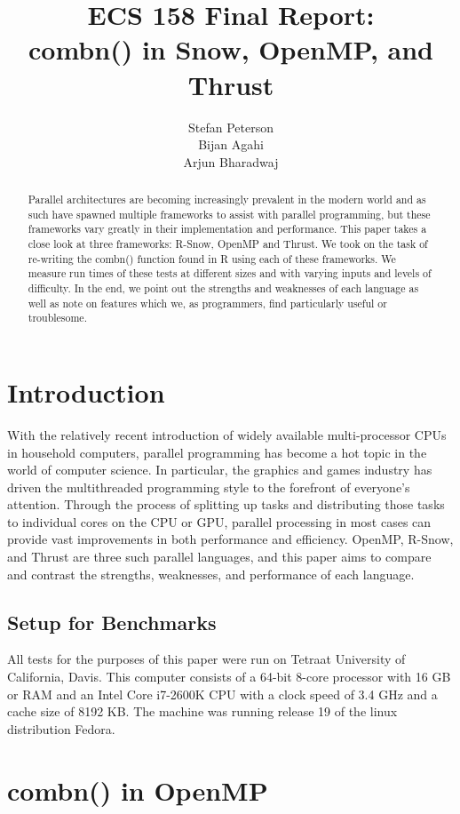 \documentclass[titlepage, 11pt]{article}
\title{\Huge ECS 158 Final Report: \\\LARGE combn() in Snow, OpenMP, and Thrust}
\date{}
\author{\huge Stefan Peterson\\\huge Bijan Agahi \\\huge Arjun Bharadwaj}
\begin{document}
\maketitle
\begin{abstract}
Parallel architectures are becoming increasingly prevalent in the modern world and as such have spawned multiple frameworks to assist with parallel programming, but these frameworks vary greatly in their implementation and performance. This paper takes a close look at three frameworks: R-Snow, OpenMP and Thrust. We took on the task of re-writing the combn() function found in R using each of these frameworks. We measure run times of these tests at different sizes and with varying inputs and levels of difficulty. In the end, we point out the strengths and weaknesses of each language as well as note on features which we, as programmers, find particularly useful or troublesome.
\end{abstract}
\tableofcontents
\newpage
\section{Introduction}
With the relatively recent introduction of widely available multi-processor CPUs in household computers, parallel programming has become a hot topic in the world of computer science. In particular, the graphics and games industry has driven the multithreaded programming style to the forefront of everyone's attention. Through the process of splitting up tasks and distributing those tasks to individual cores on the CPU or GPU, parallel processing in most cases can provide vast improvements in both performance and efficiency. OpenMP, R-Snow, and Thrust are three such parallel languages, and this paper aims to compare and contrast the strengths, weaknesses, and performance of each language.

\subsection{Setup for Benchmarks}
All tests for the purposes of this paper were run on Tetraat University of California, Davis. This computer consists of a 64-bit 8-core processor with 16 GB or RAM and an Intel Core i7-2600K CPU with a clock speed of 3.4 GHz and a cache size of 8192 KB. The machine was running release 19 of the linux distribution Fedora.



\section{combn() in OpenMP}
\end{document}
